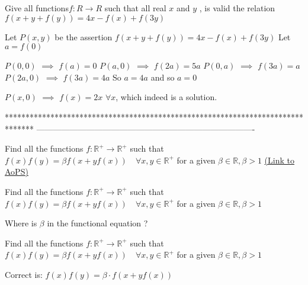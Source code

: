 \begin{solution}
	\begin{tcolorbox}Give all functions$ f:R\rightarrow R $ such that all real $ x $ and $ y $  , is valid the relation $ f(x+y+f(y))=4x-f(x)+f(3y) $\end{tcolorbox}
Let $P(x,y)$ be the assertion $f(x+y+f(y))=4x-f(x)+f(3y)$
Let $a=f(0)$

$P(0,0)$ $\implies$ $f(a)=0$
$P(a,0)$ $\implies$ $f(2a)=5a$
$P(0,a)$ $\implies$ $f(3a)=a$
$P(2a,0)$ $\implies$ $f(3a)=4a$
So $a=4a$ and so $a=0$

$P(x,0)$ $\implies$ $\boxed{f(x)=2x}$ $\forall x$, which indeed is a solution.
\end{solution}
*******************************************************************************
-------------------------------------------------------------------------------

\begin{problem}
	Find all the functions $f:\mathbb{R}^+\to\mathbb{R}^+$ such that $f(x)f(y)=\beta f(x+yf(x)) \quad \forall x,y\in\mathbb{R}^+$ for a given $\beta \in\mathbb R ,\beta>1$
	\flushright \href{https://artofproblemsolving.com/community/c6h588834}{(Link to AoPS)}
\end{problem}



\begin{solution}
	\begin{tcolorbox}Find all the functions $f:\mathbb{R}^+\to\mathbb{R}^+$ such that $f(x)f(y)=\beta f(x+yf(x)) \quad \forall x,y\in\mathbb{R}^+$ for a given $\beta \in\mathbb R ,\beta>1$\end{tcolorbox}
Where is $\beta$ in the functional equation ?
\end{solution}



\begin{solution}
	\begin{tcolorbox}Find all the functions $f:\mathbb{R}^+\to\mathbb{R}^+$ such that $f(x)f(y)=\beta f(x+yf(x)) \quad \forall x,y\in\mathbb{R}^+$ for a given $\beta \in\mathbb R ,\beta>1$\end{tcolorbox}

Correct is: $f(x)f(y)=\beta\cdot f(x+yf(x))$
\end{solution}



